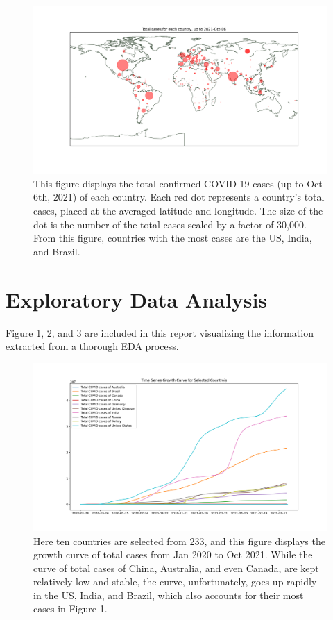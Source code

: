 \documentclass[11pt]{article}
\begin{document}
\begin{figure}[htb]
	\setlength{\abovecaptionskip}{-0.5cm}
	\centering
	\includegraphics[width=0.8\linewidth]{../figures/total-cases-map.png} %
	\caption{This figure displays the total confirmed COVID-19 cases (up to Oct 6th, 2021) of each country. Each red dot represents a country's total cases, placed at the averaged latitude and longitude. The size of the dot is the number of the total cases scaled by a factor of 30,000. From this figure, countries with the most cases are the US, India, and Brazil.} %
\end{figure}

\section{Exploratory Data Analysis}
Figure 1, 2, and 3 are included in this report visualizing the information extracted from a thorough EDA process. 

\begin{figure}[htb]
	\setlength{\abovecaptionskip}{0.cm}
	\centering
	\includegraphics[width=0.8\linewidth]{../figures/total-cases-time-series.png} %
	\caption{Here ten countries are selected from 233, and this figure displays the growth curve of total cases from Jan 2020 to Oct 2021. While the curve of total cases of China, Australia, and even Canada, are kept relatively low and stable, the curve, unfortunately, goes up rapidly in the US, India, and Brazil, which also accounts for their most cases in Figure 1.} %
\end{figure}
\end{document}
